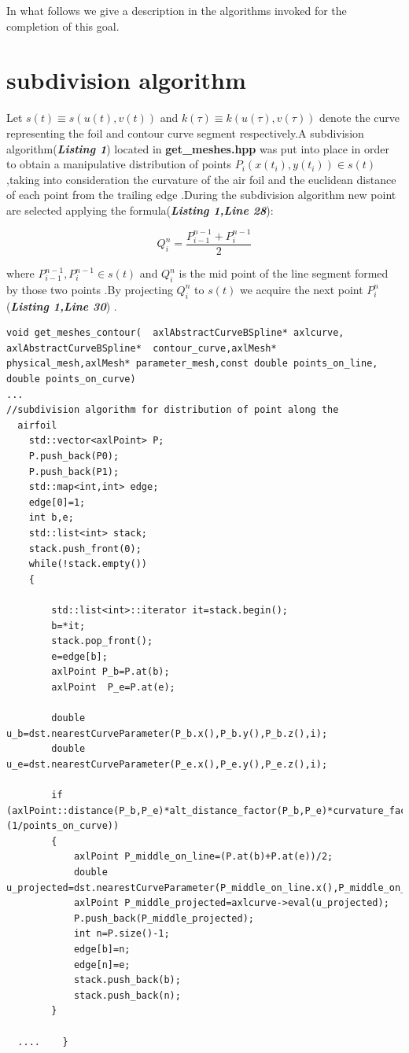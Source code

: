 \documentclass[12pt,a4paper]{article}
\begin{document}
In what follows we give a description in the algorithms invoked for the completion of this goal.

\section{subdivision algorithm}

Let $s(t)\equiv s(u(t),v(t))$ and $k(\tau)\equiv k(u(\tau),v(\tau))$ denote the curve representing the foil and contour curve segment respectively.A subdivision algorithm(\textbf{\textit{Listing 1}}) located in  \textbf{get\_meshes.hpp} was put into place in order to obtain a manipulative distribution of  points $P_{i}(x(t_{i}),y(t_{i}))\in s(t)$ ,taking into consideration the curvature of the air foil and the euclidean distance of each point from the trailing edge .During the subdivision algorithm new point are selected applying the formula(\textbf{\textit{Listing 1,Line 28}}):

$$Q_{i}^{n}=\frac{P_{i-1}^{n-1}+P_{i}^{n-1}}{2}$$



where $P_{i-1}^{n-1},P_{i}^{n-1}\in s(t)$ and $Q_{i}^{n}$ is the mid point of the line segment formed by those two points .By projecting $Q_{i}^{n}$ to $s(t)$ we acquire the next point $P_{i}^{n}$(\textbf{\textit{Listing 1,Line 30}}) .


\begin{lstlisting}[label=some-code,caption=subdivision algorithm]
void get_meshes_contour(  axlAbstractCurveBSpline* axlcurve, axlAbstractCurveBSpline*  contour_curve,axlMesh* physical_mesh,axlMesh* parameter_mesh,const double points_on_line, double points_on_curve)
...
//subdivision algorithm for distribution of point along the
  airfoil
    std::vector<axlPoint> P;
    P.push_back(P0);
    P.push_back(P1);
    std::map<int,int> edge;
    edge[0]=1;
    int b,e;
    std::list<int> stack;
    stack.push_front(0);
    while(!stack.empty())
    {

        std::list<int>::iterator it=stack.begin();
        b=*it;
        stack.pop_front();
        e=edge[b];
        axlPoint P_b=P.at(b);
        axlPoint  P_e=P.at(e);

        double   u_b=dst.nearestCurveParameter(P_b.x(),P_b.y(),P_b.z(),i);
        double  u_e=dst.nearestCurveParameter(P_e.x(),P_e.y(),P_e.z(),i);

        if (axlPoint::distance(P_b,P_e)*alt_distance_factor(P_b,P_e)*curvature_factor(axlcurve,u_b,u_e)>(1/points_on_curve))
        {
            axlPoint P_middle_on_line=(P.at(b)+P.at(e))/2;
            double u_projected=dst.nearestCurveParameter(P_middle_on_line.x(),P_middle_on_line.y(),P_middle_on_line.z(),i);
            axlPoint P_middle_projected=axlcurve->eval(u_projected);
            P.push_back(P_middle_projected);
            int n=P.size()-1;
            edge[b]=n;
            edge[n]=e;
            stack.push_back(b);
            stack.push_back(n);
        }
           
  ....    }
\end{lstlisting}
\end{document}
